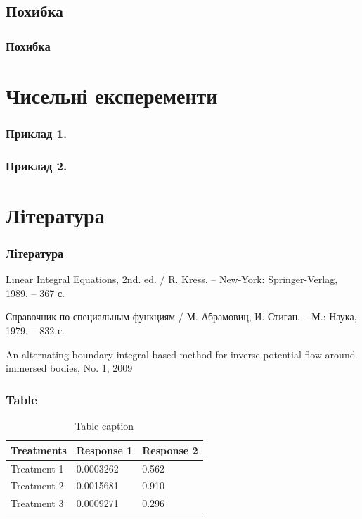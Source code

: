 \documentclass{beamer}
\numberwithin{equation}{section}
\begin{document}
	\subsection{Похибка}	
	\begin{frame}
		\frametitle{Похибка}
	\end{frame}
	

	\section{Чисельні експеременти} 

	\begin{frame}
		\frametitle{Приклад 1.}
	\end{frame}
	
	\begin{frame}
		\frametitle{Приклад 2.}
	\end{frame}
	
	
\section*{Література}
\begin{frame}
	\thispagestyle{empty}
	\frametitle{Література}
	\begin{thebibliography}{99}
		

		Linear Integral Equations, 2nd. ed. / R. Kress. -- 
		New-York: Springer-Verlag, 1989. -- 367 с.

		Справочник по специальным функциям / М. Абрамовиц, И. Стиган. 
		-- М.: Наука, 1979. -- 832 с.
		
		An alternating boundary integral based method for inverse potential flow around immersed bodies, No. 1, 2009
		
	\end{thebibliography}
\end{frame}

	
	
	\begin{frame}

		\frametitle{Table}
		\begin{table}
			\begin{tabular}{l l l}
				\toprule
				\textbf{Treatments} & \textbf{Response 1} & \textbf{Response 2}\\
				\midrule
				Treatment 1 & 0.0003262 & 0.562 \\
				Treatment 2 & 0.0015681 & 0.910 \\
				Treatment 3 & 0.0009271 & 0.296 \\
				\bottomrule
			\end{tabular}
			\caption{Table caption}
		\end{table}
	\end{frame}
	
	
\end{document}
